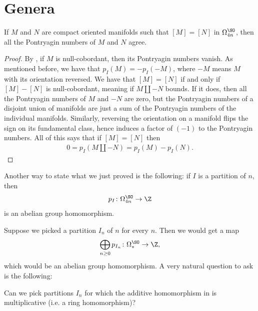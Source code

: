 \documentclass[11pt]{book}
\begin{document}
\section{Genera}

\begin{lemma}\label{lem:pI-additive-out-of-omegason} 
If $M$ and $N$ are compact oriented manifolds such that $[M]=[N]$ in $\Omega^\SO_{4n}$, then all the Pontryagin numbers of $M$ and $N$ agree.
\end{lemma}
\begin{proof} By , if $M$ is null-cobordant, then its Pontryagin numbers vanish. As mentioned before, we have that $p_I(M) = - p_I(-M)$, where $-M$ means $M$ with its orientation reversed. We have that $[M] = [N]$ if and only if $[M] - [N]$ is null-cobordant, meaning if $M \amalg -N$ bounds. If it does, then all the Pontryagin numbers of $M$ and $-N$ are zero, but the Pontryagin numbers of a disjoint union of manifolds are just a sum of the Pontryagin numbers of the individual manifolds. Similarly, reversing the orientation on a manifold flips the sign on its fundamental class, hence induces a factor of $(-1)$ to the Pontryagin numbers. All of this says that if $[M] = [N]$ then
\begin{align*}
    0 = p_I(M \amalg -N) = p_I(M) - p_I(N).
\end{align*}
\end{proof}

Another way to state what we just proved is the following: if $I$ is a partition of $n$, then
\begin{align*}
    p_I \colon \Omega^\SO_{4n} \to \Z
\end{align*}
is an abelian group homomorphism.

Suppose we picked a partition $I_n$ of $n$ for every $n$. Then we would get a map
\begin{equation}\label{eqn:genus-from-partitions}
\begin{aligned}
    \bigoplus_{n\ge0} p_{I_n} \colon \Omega^\SO_\ast \to \Z,
\end{aligned}
\end{equation}
which would be an abelian group homomorphism. A very natural question to ask is the following:

\begin{question} Can we pick partitions $I_n$ for which the additive homomorphism in  is multiplicative (i.e. a ring homomorphism)?
\end{question}
\end{document}

